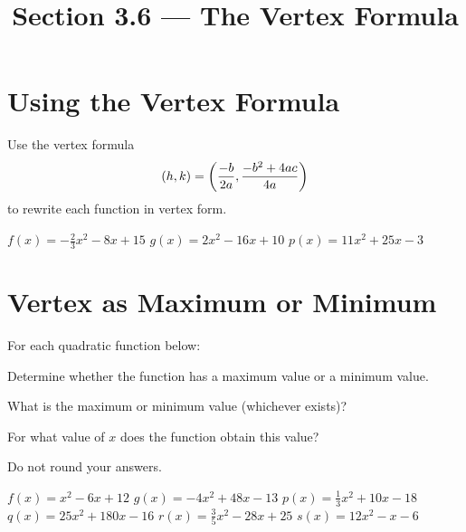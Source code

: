 

\title{Section 3.6 --- The Vertex Formula}


\maketitle
\section*{Using the Vertex Formula}
Use the vertex formula
\[
\left(h,k\right)=\left(\dfrac{-b}{2a},\dfrac{-b^2+4ac}{4a}\right)
\]
to rewrite each function in vertex form.
\begin{smenum}
\mitemxxx
{$f(x)=-\frac{2}{3}x^2-8x+15$}
{$g(x)=2x^2-16x+10$}
{$p(x)=11x^2+25x-3$}
\end{smenum}

\section*{Vertex as Maximum or Minimum}
For each quadratic function below:
\begin{clist}
\item Determine whether the function has a maximum value or a minimum value.
\item What is the maximum or minimum value (whichever exists)?
\item For what value of $x$ does the function obtain this value?
\end{clist}
Do not round your answers.
\begin{smenum}
\mitemxxx
{$f(x)=x^2-6x+12$}
{$g(x)=-4x^2+48x-13$}
{$p(x)=\frac{1}{3}x^2+10x-18$}
\mitemxxx
{$q(x)=25x^2+180x-16$}
{$r(x)=\frac{3}{5}x^2-28x+25$}
{$s(x)=12x^2-x-6$}
\end{smenum}

